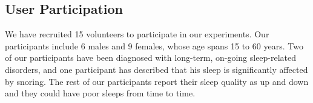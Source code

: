 


\subsection{User Participation} We have recruited 15 volunteers to participate in our experiments. Our
participants include 6 males and 9 females, whose age spans 15 to 60 years. Two of our participants have been diagnosed with long-term,
on-going sleep-related disorders, and one participant has described that his sleep is significantly affected by snoring. The rest of our
participants report their sleep quality as up and down and they could have poor sleeps from time to time.

